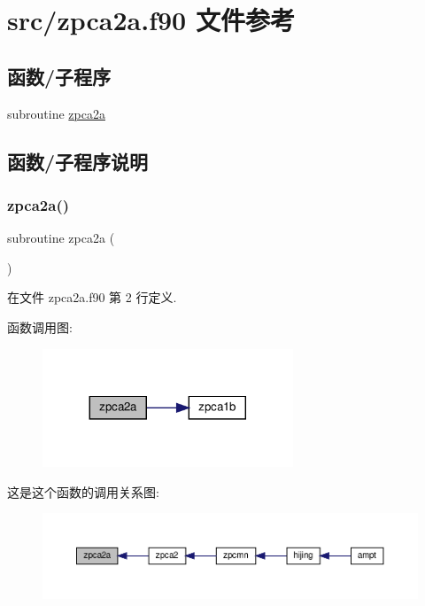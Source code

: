\hypertarget{zpca2a_8f90}{}\section{src/zpca2a.f90 文件参考}
\label{zpca2a_8f90}
\subsection*{函数/子程序}
\begin{DoxyCompactItemize}
\item 
subroutine \mbox{\hyperlink{zpca2a_8f90_a4dfb877714a2f6a78918097e6ee72c2e}{zpca2a}}
\end{DoxyCompactItemize}


\subsection{函数/子程序说明}
\mbox{\label{zpca2a_8f90_a4dfb877714a2f6a78918097e6ee72c2e}} 
\subsubsection{\texorpdfstring{zpca2a()}{zpca2a()}}
{\footnotesize\ttfamily subroutine zpca2a (\begin{DoxyParamCaption}{ }\end{DoxyParamCaption})}



在文件 zpca2a.\+f90 第 2 行定义.

函数调用图\+:
\nopagebreak
\begin{figure}[H]
\begin{center}
\leavevmode
\includegraphics[width=212pt]{zpca2a_8f90_a4dfb877714a2f6a78918097e6ee72c2e_cgraph}
\end{center}
\end{figure}
这是这个函数的调用关系图\+:
\nopagebreak
\begin{figure}[H]
\begin{center}
\leavevmode
\includegraphics[width=350pt]{zpca2a_8f90_a4dfb877714a2f6a78918097e6ee72c2e_icgraph}
\end{center}
\end{figure}
